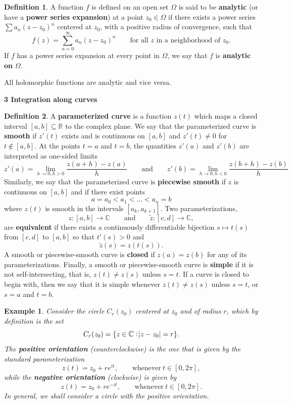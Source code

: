 \documentclass{article}
\newtheorem*{example}{Example}
\theoremstyle{definition}
\newtheorem{definition}{Definition}[section]
\theoremstyle{remark}
\begin{document}
    \begin{definition}
        A function $f$ is defined on an open set $\Omega$ is said to be \textbf{analytic} (or have a \textbf{power series expansion})
        at a point $z_0\in\Omega$ if there exists a power series $\sum a_n(z-z_0)^n$ centered at $z_0$, with a positive radius of
        convergence, such that
        \[ f(z) = \sum_{n=0}^{\infty} a_n(z-z_0)^n\qquad\text{for all $z$ in a neighborhood of $z_0$}. \]
        If $f$ has a power series expansion at every point in $\Omega$, we say that $f$ is \textbf{analytic on} $\Omega$.
    \end{definition}

    All holomorphic functions are analytic and vice versa.

    \newpage

    \textbf{3 Integration along curves}

    \begin{definition}
        A \textbf{parameterized curve} is a function $z(t)$ which maps a closed interval $[a,b]\subseteq\mathbb{R}$ to the complex
        plane. We say that the parameterized curve is \textbf{smooth} if $z'(t)$ exists and is continuous on $[a,b]$ and $z'(t)\neq 0$
        for $t\not\in[a,b]$. At the points $t=a$ and $t=b$, the quantities $z'(a)$ and $z'(b)$ are interpreted as one-sided limits
        \[ z'(a) = \lim_{h\to0,h>0} \frac{z(a+h)-z(a)}{h}\qquad\text{and}\qquad z'(b) = \lim_{h\to0,h<0} \frac{z(b+h)-z(b)}{h} \]
        Similarly, we say that the parameterized curve is \textbf{piecewise smooth} if $z$ is continuous on $[a,b]$ and if there
        exist points
        \[ a = a_0 < a_1 < \hdots < a_n = b \]
        where $z(t)$ is smooth in the intervals $[a_k,a_{k+1}]$. Two parameterizations,
        \[ z:[a,b]\to\mathbb{C} \qquad\text{and}\qquad\tilde{z}:[c,d]\to\mathbb{C}, \]
        are \textbf{equivalent} if there exists a continuously differentiable bijection $s\mapsto t(s)$ from $[c,d]$ to $[a,b]$
        so that $t'(s) > 0$ and
        \[ \tilde{z}(s) = z(t(s)). \]
        A smooth or piecewise-smooth curve is \textbf{closed} if $z(a) = z(b)$ for any of its parameterizations. Finally, a smooth
        or piecewise-smooth curve is \textbf{simple} if it is not self-intersecting, that is, $z(t)\neq z(s)$ unless $s=t$. If a
        curve is closed to begin with, then we say that it is simple whenever $z(t)\neq z(s)$ unless $s=t$, or $s=a$ and $t=b$.
    \end{definition}

    \begin{example}
        Consider the circle $C_r(z_0)$ centered at $z_0$ and of radius $r$, which by definition is the set
        \[ C_r(z_0) = \{z\in\mathbb{C}: \abs{z-z_0} = r\}. \]
        The \textbf{positive orientation} (counterclockwise) is the one that is given by the standard parameterization
        \[ z(t) = z_0 + re^{it},\qquad\text{whenever}\:t\in[0,2\pi], \]
        while the \textbf{negative orientation} (clockwise) is given by
        \[ z(t) = z_0 + re^{-it},\qquad\text{whenever}\:t\in[0,2\pi]. \]
        In general, we shall consider a circle with the \textit{positive} orientation.
    \end{example}
\end{document}
